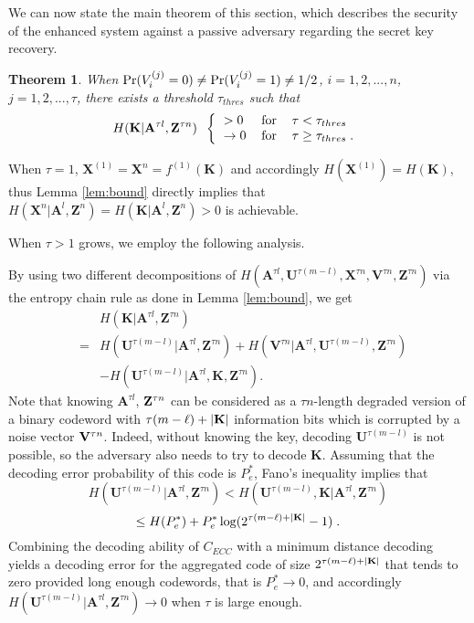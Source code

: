 \documentclass{article}[11pt]
\newcommand{\am}{\mathbf{A}}
\newcommand{\km}{\mathbf{K}}
\newcommand{\um}{\mathbf{U}}
\newcommand{\vm}{\mathbf{V}}
\newcommand{\xm}{\mathbf{X}}
\newcommand{\zm}{\mathbf{Z}}
\newtheorem{theor}{Theorem}
\newenvironment{proof}{\noindent {\bf Proof. \ }}{\hfill \vrule height 2pt depth 4pt width 6pt\par\noindent}
\begin{document}
We can now state the main theorem of this section, which describes
the security of the enhanced system against a passive adversary
regarding the secret key recovery.
\begin{theor}\label{theor:pass}
When ${\rm Pr}(V_i^{(j)}=0) \neq {\rm Pr}(V_i^{(j)}=1) \neq 1/2$,
$i=1,2,...,n$, $j=1,2,...,\tau$, there exists a threshold $\tau_{thres}$
such that
\[
H(\km|\am^{\tau l},\zm^{\tau n}) \;\;
\left\{ \begin{tabular}{lll}
$> 0$ & {\rm for} & $\tau < \tau_{thres}$ \\
$\rightarrow 0$   & {\rm for} & $\tau \geq \tau_{thres} \;.$\\
\end{tabular}\right.
\]
\end{theor}

\begin{proof}
When $\tau = 1$, $\xm^{(1)}=\xm^n =f^{(1)}(\km)$ and accordingly
$H(\xm^{(1)}) = H(\km)$, thus Lemma \ref{lem:bound}
directly implies that $H(\xm^n|\am^l,\zm^n)=H(\km|\am^{l},\zm^{n}) > 0$ is
achievable.

When $\tau > 1$ grows, we employ the following analysis.

By using two different decompositions of $H(\am^{\tau
l},\um^{\tau(m-l)},\xm^{\tau n},\vm^{\tau n},\zm^{\tau n})$ via
the entropy chain rule as done in Lemma \ref{lem:bound}, we get
\begin{eqnarray}
&&H(\km|\am^{\tau l},\zm^{\tau n})\nonumber \\
&=& H(\um^{\tau(m-l)}|\am^{\tau l},\zm^{\tau n}) +
   H(\vm^{\tau n}|\am^{\tau l},\um^{\tau(m-l)},\zm^{\tau n})\nonumber \\
&& -H(\um^{\tau(m-l)}|\am^{\tau l},\km,\zm^{\tau n}).
\label{eq:HKAZ}
\end{eqnarray}
Note that knowing $\am^{\tau l}$, ${\bf Z}^{\tau n}$ can be considered as a $\tau
n$-length degraded version of a binary codeword with $\tau
(m-\ell) + |{\bf K}|$ information bits which is corrupted by a
noise vector ${\bf V}^{\tau n}$. Indeed, without knowing the key, decoding $\um^{\tau(m-l)}$ is
not possible, so the adversary also needs to try to decode $\km$. Assuming that the decoding error
probability of this code is $P_e^*$, Fano's inequality implies
that
\begin{displaymath}
H(\um^{\tau(m-l)}|\am^{\tau l},\zm^{\tau n})  <
H(\um^{\tau(m-l)}, \km |\am^{\tau l},\zm^{\tau n})
\end{displaymath}
\begin{displaymath}
\leq H(P_e^*) + P_e^* \log(2^{\tau(m-\ell) + |{\bf K}|}-1) \;.
\end{displaymath}
Combining the decoding ability of $C_{ECC}$ with a minimum
distance decoding yields a decoding error for the aggregated code
of size $2^{\tau(m-\ell) + |{\bf K}|}$ that tends to zero provided
long enough codewords, that is $P_e^* \rightarrow 0$, and accordingly
$H(\um^{\tau(m-l)}|\am^{\tau l},\zm^{\tau n}) \rightarrow 0$ when
$\tau$ is large enough.


\end{proof}
\end{document}
